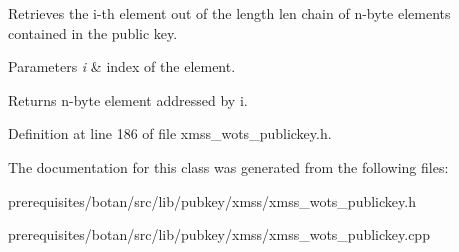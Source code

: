 Retrieves the i-\/th element out of the length len chain of n-\/byte elements contained in the public key.


\begin{DoxyParams}{Parameters}
{\em i} & index of the element. \\
\hline
\end{DoxyParams}
\begin{DoxyReturn}{Returns}
n-\/byte element addressed by i. 
\end{DoxyReturn}


Definition at line 186 of file xmss\+\_\+wots\+\_\+publickey.\+h.



The documentation for this class was generated from the following files\+:\begin{DoxyCompactItemize}
\item 
prerequisites/botan/src/lib/pubkey/xmss/xmss\+\_\+wots\+\_\+publickey.\+h\item 
prerequisites/botan/src/lib/pubkey/xmss/xmss\+\_\+wots\+\_\+publickey.\+cpp\end{DoxyCompactItemize}
